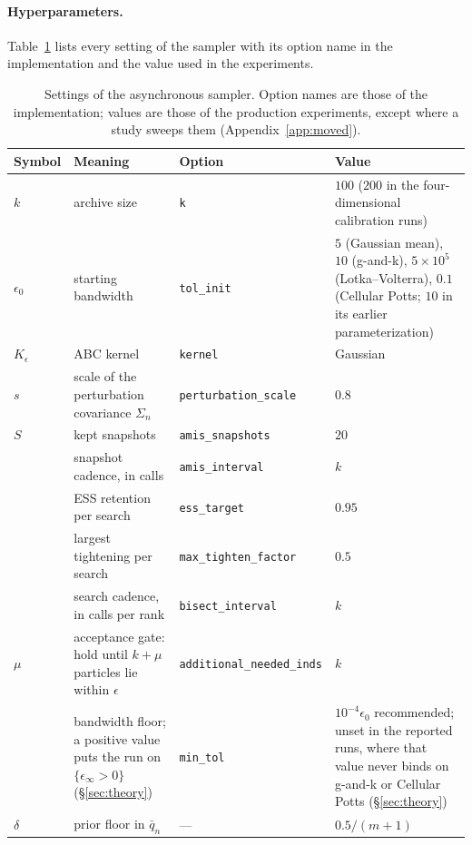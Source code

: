 \documentclass[10pt]{article}
\theoremstyle{plain}
\theoremstyle{definition}
\begin{document}
\paragraph{Hyperparameters.} Table~\ref{tab:hyperparameters} lists every setting of the sampler with its option name in the implementation and the value used in the experiments.
\begin{table}[h]
\caption{Settings of the asynchronous sampler. Option names are those of the implementation; values are those of the production experiments, except where a study sweeps them (Appendix~\ref{app:moved}).}\label{tab:hyperparameters}
\centering
\footnotesize
\begin{tabular}{@{}>{\raggedright\arraybackslash}p{}>{\raggedright\arraybackslash}p{}>{\raggedright\arraybackslash}p{}>{\raggedright\arraybackslash}p{}@{}}
\toprule
Symbol & Meaning & Option & Value \\
\midrule
$k$ & archive size & \texttt{k} & $100$ ($200$ in the four-dimensional calibration runs) \\
$\epsilon_0$ & starting bandwidth & \texttt{tol\_init} & $5$ (Gaussian mean), $10$ (g-and-k), $5\times10^{5}$ (Lotka--Volterra), $0.1$ (Cellular Potts; $10$ in its earlier parameterization) \\
$K_\epsilon$ & ABC kernel & \texttt{kernel} & Gaussian \\
$s$ & scale of the perturbation covariance $\Sigma_n$ & \texttt{perturbation\_scale} & $0.8$ \\
$S$ & kept snapshots & \texttt{amis\_snapshots} & $20$ \\
 & snapshot cadence, in calls & \texttt{amis\_interval} & $k$ \\
 & ESS retention per search & \texttt{ess\_target} & $0.95$ \\
 & largest tightening per search & \texttt{max\_tighten\_factor} & $0.5$ \\
 & search cadence, in calls per rank & \texttt{bisect\_interval} & $k$ \\
$\mu$ & acceptance gate: hold until $k+\mu$ particles lie within $\epsilon$ & \texttt{additional\_needed\_inds} & $k$ \\
 & bandwidth floor; a positive value puts the run on $\{\epsilon_\infty>0\}$ (\S\ref{sec:theory}) & \texttt{min\_tol} & $10^{-4}\epsilon_0$ recommended; unset in the reported runs, where that value never binds on g-and-k or Cellular Potts (\S\ref{sec:theory}) \\
$\delta$ & prior floor in $\bar q_n$ & --- & $0.5/(m{+}1)$ \\
\bottomrule
\end{tabular}
\end{table}
\end{document}
